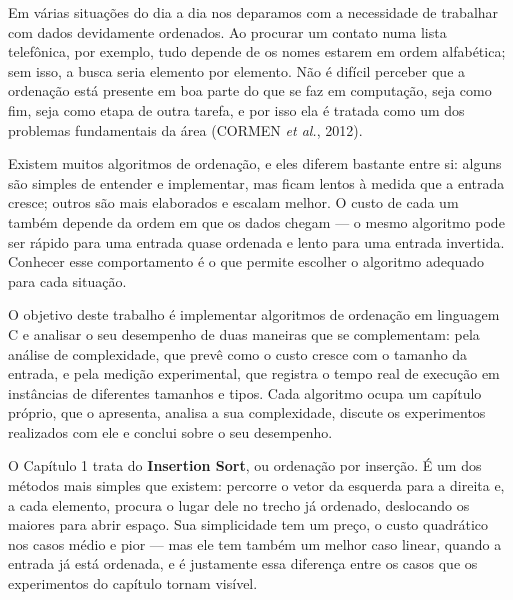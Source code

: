 
\indent \qquad Em várias situações do dia a dia nos deparamos com a
necessidade de trabalhar com dados devidamente ordenados. Ao procurar um
contato numa lista telefônica, por exemplo, tudo depende de os nomes estarem
em ordem alfabética; sem isso, a busca seria elemento por elemento. Não é
difícil perceber que a ordenação está presente em boa parte do que se faz em
computação, seja como fim, seja como etapa de outra tarefa, e por isso ela é
tratada como um dos problemas fundamentais da área (CORMEN \textit{et al.},
2012).

\qquad Existem muitos algoritmos de ordenação, e eles diferem bastante entre
si: alguns são simples de entender e implementar, mas ficam lentos à medida que
a entrada cresce; outros são mais elaborados e escalam melhor. O custo de cada
um também depende da ordem em que os dados chegam --- o mesmo algoritmo pode
ser rápido para uma entrada quase ordenada e lento para uma entrada invertida.
Conhecer esse comportamento é o que permite escolher o algoritmo adequado para
cada situação.

\qquad O objetivo deste trabalho é implementar algoritmos de ordenação em
linguagem C e analisar o seu desempenho de duas maneiras que se complementam:
pela análise de complexidade, que prevê como o custo cresce com o tamanho da
entrada, e pela medição experimental, que registra o tempo real de execução em
instâncias de diferentes tamanhos e tipos. Cada algoritmo ocupa um capítulo
próprio, que o apresenta, analisa a sua complexidade, discute os experimentos
realizados com ele e conclui sobre o seu desempenho.

\qquad O Capítulo 1 trata do \textbf{Insertion Sort}, ou ordenação por
inserção. É um dos métodos mais simples que existem: percorre o vetor da
esquerda para a direita e, a cada elemento, procura o lugar dele no trecho já
ordenado, deslocando os maiores para abrir espaço. Sua simplicidade tem um
preço, o custo quadrático nos casos médio e pior --- mas ele tem também um
melhor caso linear, quando a entrada já está ordenada, e é justamente essa
diferença entre os casos que os experimentos do capítulo tornam visível.
